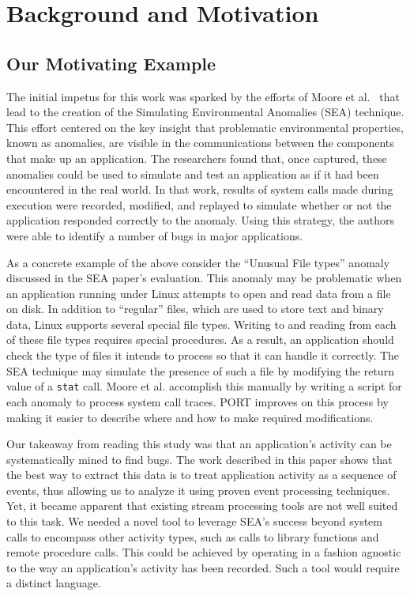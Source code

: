 \section{Background and Motivation}
\label{SEC:background}


\subsection{Our Motivating Example}
\label{sec:MotivatingExample}

The initial impetus for this work was sparked by the efforts of Moore et al.~\cite{DBLP:conf/issre/MooreCFW19}
that lead to the creation of
the Simulating Environmental Anomalies (SEA) technique.
This effort centered on the key insight
that problematic
environmental properties,
known as anomalies, are visible in the
communications between the components that make up an application.
The researchers found that,
once captured,
these anomalies
could be
used to simulate and 
test
an application as if
it had been encountered
in the real world.
In that work, results of system calls made
during execution were recorded, modified, and replayed to simulate whether or not the application
responded correctly to the anomaly.
Using this strategy, the authors were able to identify a number of bugs
in major applications.

As a concrete example of the above
consider the ``Unusual File types'' anomaly
discussed in the SEA paper's evaluation.
This anomaly may be problematic
when an application running under Linux
attempts to open and read data from a file on disk.
In addition to ``regular'' files,
which are used to store text and
binary data,
Linux supports several special file types.
Writing to and
reading from each of these file types requires special procedures.
As a result, an application should check the type of files it intends to
process so that it can handle it correctly.
The SEA technique
may simulate the presence of such a file by
modifying
the return value
of a {\tt stat} call.
Moore et al. accomplish this manually
by writing a script
for each anomaly
to process system call traces.
PORT improves on this process by
making it easier to describe
where and how to make required modifications.

Our takeaway
from reading this study
was that an application's activity
can be systematically mined to find bugs.
The work described in this paper
shows that the best way to extract this data
is to treat application activity
as a sequence of events,
thus allowing us to analyze it using
proven event processing techniques. 
Yet, it became apparent that existing
stream processing tools
are not well suited to this task. We needed a 
novel tool to leverage
SEA's success beyond system calls to encompass other activity types,
such as calls to library functions
and remote procedure calls.
This could be achieved by operating in a fashion agnostic to the way an application's activity has been recorded. Such a tool would require a distinct language. 


